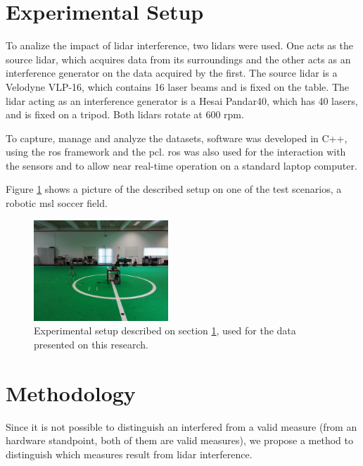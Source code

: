 \documentclass[extendedabs]{recpad2k}
\begin{document}
\section{Experimental Setup}
\label{sec:experimental_setup}
To analize the impact of \gls{lidar} interference, two \gls{lidar}s were used. One acts as the source \gls{lidar}, which acquires data from its surroundings and the other acts as an interference generator on the data acquired by the first.  
The source \gls{lidar} is a Velodyne VLP-16, which contains 16 laser beams and is fixed on the table. The \gls{lidar} acting as an interference generator is a Hesai Pandar40, which has 40 lasers, and is fixed on a tripod. Both \gls{lidar}s rotate at 600 \gls{rpm}.


To capture, manage and analyze the datasets, software was developed in C++, using the \gls{ros} framework and the \gls{pcl}. \gls{ros} was also used for the interaction with the sensors and to allow near real-time operation on a standard laptop computer.

Figure \ref{fig:experimental_setup} shows a picture of the described setup on one of the test scenarios, a robotic \gls{msl} soccer field.

\begin{figure}[h]
    \centering
    \includegraphics[width=0.45\textwidth]{images/CAMBADA_experimenta_setup.jpg}
    \caption{Experimental setup described on section \ref{sec:experimental_setup}, used for the data presented on this research.}
    \label{fig:experimental_setup}
\end{figure}

\section{Methodology}
\label{sec:methodology}
Since it is not possible to distinguish an interfered from a valid measure (from an hardware standpoint, both of them are valid measures), we propose a method to distinguish which measures result from \gls{lidar} interference.
\end{document}
